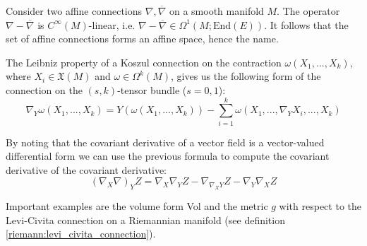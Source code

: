 	\begin{property}[Affinity]
		Consider two affine connections $\nabla, \overline\nabla$ on a smooth manifold $M$. The operator $\nabla-\overline\nabla$ is $C^\infty(M)$-linear, i.e. $\nabla-\overline\nabla\in\Omega^1(M;\text{End}(E))$. It follows that the set of affine connections forms an affine space, hence the name.
	\end{property}

	\begin{formula}
		The Leibniz property of a Koszul connection on the contraction $\omega(X_1, ..., X_k)$, where $X_i\in\mathfrak{X}(M)$ and $\omega\in\Omega^k(M)$, gives us the following form of the connection on the $(s, k)$-tensor bundle ($s=0,1$):
		\begin{equation}
			\nabla_Y\omega(X_1, ..., X_k) = Y(\omega(X_1, ..., X_k)) - \sum_{i=1}^k\omega(X_1, ..., \nabla_YX_i, ..., X_k)
		\end{equation}
	\end{formula}
	\begin{result}
		By noting that the covariant derivative of a vector field is a vector-valued differential form we can use the previous formula to compute the covariant derivative of the covariant derivative:
		\begin{equation}
			(\nabla_X\nabla)_YZ = \nabla_X\nabla_YZ - \nabla_{\nabla_XY}Z - \nabla_Y\nabla_XZ
		\end{equation}
	\end{result}
	
	\begin{example}
		Important examples are the volume form Vol and the metric $g$ with respect to the Levi-Civita connection on a Riemannian manifold (see definition \ref{riemann:levi_civita_connection}). 
	\end{example}
